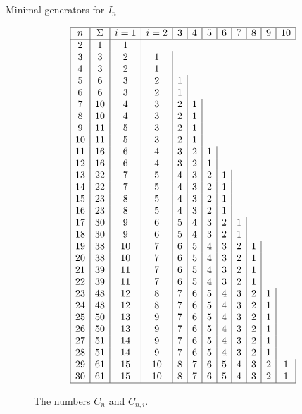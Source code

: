 \documentclass[reqno,10pt]{amsart}
\theoremstyle{definition}
\theoremstyle{remark}
\theoremstyle{plain}
\begin{document}
\begin{section}{Minimal generators for \(I_n\)}
  \begin{figure}[p]
    \begin{center}
      \leavevmode
      \caption{The numbers \(C_n\) and \(C_{n,i}\).}
      \label{fig:Cni}
      \tiny{
      \begin{displaymath}
\begin {array}{|c|c|c|c|c|c|c|c|c|c|c|c|} 
\hline
n & \Sigma & i=1 & i=2 & 3 & 4 & 5 & 6 & 7 & 8 &9 & 10\\ \hline
2&1&1
\\3&3&2&1
\\4&3&2&1
\\5&6&3&2&1
\\6&6&3&2&1
\\7&10&4&3&2&1
\\8&10&4&3&2&1
\\9&11&5&3&2&1
\\10&11&5&3&2&1
\\11&16&6&4&3&2&1
\\12&16&6&4&3&2&1
\\13&22&7&5&4&3&2&1
\\14&22&7&5&4&3&2&1
\\15&23&8&5&4&3&2&1
\\16&23&8&5&4&3&2&1
\\17&30&9&6&5&4&3&2&1
\\18&30&9&6&5&4&3&2&1
\\19&38&10&7&6&5&4&3&2&1
\\20&38&10&7&6&5&4&3&2&1 \\
21 & 39 & 11 & 7 & 6 & 5  & 4 & 3 & 2 & 1\\
22 & 39 & 11 & 7 & 6 & 5  & 4 & 3 & 2 & 1\\
23 & 48 & 12 & 8 & 7 & 6 & 5 & 4 & 3 & 2 & 1 \\
24 & 48 & 12 & 8 & 7 & 6 & 5 & 4 & 3 & 2 & 1 \\
25 & 50 & 13 & 9 & 7 & 6 & 5 & 4 & 3 & 2 & 1 \\
26 & 50 & 13 & 9 & 7 & 6 & 5 & 4 & 3 & 2 & 1 \\
27 & 51 & 14& 9 & 7 & 6 & 5 & 4 & 3 & 2 & 1 \\
28 & 51 & 14& 9 & 7 & 6 & 5 & 4 & 3 & 2 & 1 \\
29 & 61 & 15 & 10 & 8 & 7 & 6 & 5 & 4 & 3 & 2 & 1 \\
30 & 61 & 15 & 10 & 8 & 7 & 6 & 5 & 4 & 3 & 2 & 1 \\ \hline
\end {array}
      \end{displaymath}

}
\end{center}
\end{figure}
\end{section}
\end{document}
